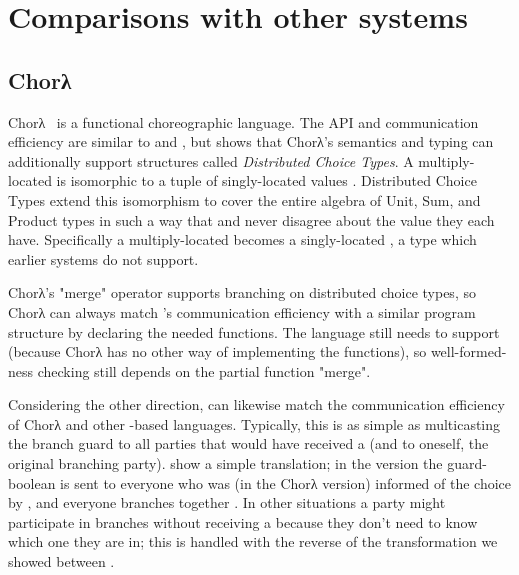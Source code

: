 \section{Comparisons with other systems}
\label{sec:formalism-comparisons}


\subsection{Chorλ}\label{sec:chor-lambda}
Chorλ~\cite{chor-lambda} is a functional choreographic language.
The API and communication efficiency are similar to \cite{hirsch2021pirouette} and \cite{giallorenzo-choral},
but \cite{chor-lambda-2} shows that Chorλ's semantics and typing can additionally support structures called \emph{Distributed Choice Types}.
A multiply-located  is isomorphic to a tuple of singly-located values .
Distributed Choice Types extend this isomorphism to cover the entire algebra of Unit, Sum, and Product types
in such a way that  and  never disagree about the value they each have.
Specifically a multiply-located  becomes a singly-located ,
a type which earlier systems do not support.

Chorλ's "merge" operator supports branching on distributed choice types,
so Chorλ can always match \HLSCentral's communication efficiency with a similar program structure
by declaring the needed  functions.
The language still needs to support 
(because Chorλ has no other way of implementing the  functions),
so well-formed-ness checking still depends on the partial function "merge".

Considering the other direction, \HLSCentral can likewise match the communication efficiency of Chorλ
and other -based languages.
Typically, this is as simple as multicasting the branch guard to all parties that would have received a 
(and to oneself, the original branching party).
 show a simple translation;
in the \HLSCentral version the guard-boolean is sent to everyone who was (in the Chorλ version) informed of the choice by ,
and everyone branches together
.
In other situations a party might participate in branches without receiving a 
because they don't need to know which one they are in;
this is handled with the reverse of the transformation we showed between 
.

